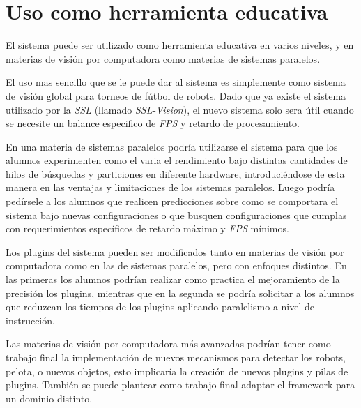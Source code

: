 
\section{Uso como herramienta educativa}

\label{usoEducativo}

El sistema puede ser utilizado como herramienta educativa en varios niveles, y
en materias de visión por computadora como materias de sistemas paralelos.

El uso mas sencillo que se le puede dar al sistema es simplemente como sistema
de visión global para torneos de fútbol de robots. Dado que ya existe el sistema
utilizado por la \emph{SSL} (llamado \emph{SSL-Vision}), el nuevo sistema solo
sera útil cuando se necesite un balance especifico de \emph{FPS} y retardo de
procesamiento.

En una materia de sistemas paralelos podría utilizarse el sistema para que los
alumnos experimenten como el varia el rendimiento bajo distintas cantidades de
hilos de búsquedas y particiones en diferente hardware, introduciéndose de esta
manera en las ventajas y limitaciones de los sistemas paralelos. Luego podría
pedírsele a los alumnos que realicen predicciones sobre como se comportara el
sistema bajo nuevas configuraciones o que busquen configuraciones que cumplas
con requerimientos específicos de retardo máximo y \emph{FPS} mínimos.

Los plugins del sistema pueden ser modificados tanto en materias de visión por
computadora como en las de sistemas paralelos, pero con enfoques distintos. En
las primeras los alumnos podrían realizar como practica el mejoramiento de la
precisión los plugins, mientras que en la segunda se podría solicitar a los
alumnos que reduzcan los tiempos de los plugins aplicando paralelismo a nivel de
instrucción.

Las materias de visión por computadora más avanzadas podrían tener como trabajo
final la implementación de nuevos mecanismos para detectar los robots, pelota, o
nuevos objetos, esto implicaría la creación de nuevos plugins y pilas de
plugins. También se puede plantear como trabajo final adaptar el framework para
un dominio distinto.
